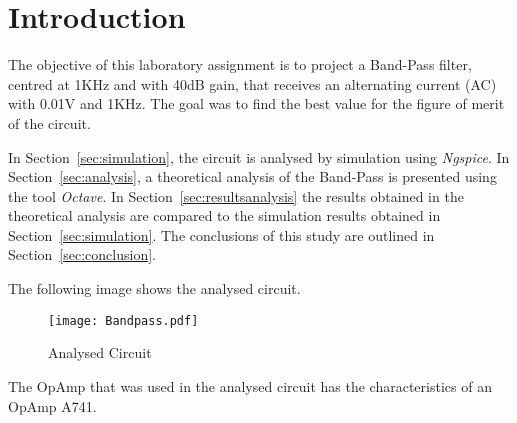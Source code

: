 \section{Introduction}
\label{sec:introduction}

The objective of this laboratory assignment is to project a Band-Pass filter, centred at 1KHz and with 40dB gain, that receives an alternating current (AC) with 0.01V and 1KHz. The goal was to find the best value for the figure of merit of the circuit.

In Section~\ref{sec:simulation}, the circuit is analysed by simulation using \textit{Ngspice}. In Section~\ref{sec:analysis}, a theoretical analysis of the Band-Pass is presented using the tool \textit{Octave}. In Section~\ref{sec:resultsanalysis} the results obtained in the theoretical analysis are compared to the simulation results obtained in Section~\ref{sec:simulation}. The conclusions of this study are outlined in
Section~\ref{sec:conclusion}.

The following image shows the analysed circuit.

\begin{figure}[h] \centering
  \texttt{[image: Bandpass.pdf]}
    \caption{Analysed Circuit}
     \label{fig:circuit}
\end{figure}

The OpAmp that was used in the analysed circuit has the characteristics of an OpAmp A741.  

